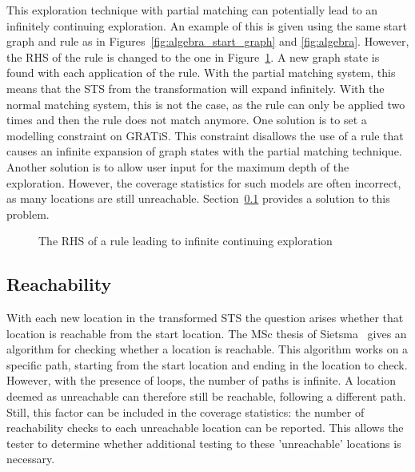 This exploration technique with partial matching can potentially lead to an infinitely continuing exploration. An example of this is given using the same start graph and rule as in Figures~\ref{fig:algebra_start_graph} and \ref{fig:algebra}. However, the RHS of the rule is changed to the one in Figure~\ref{fig:algebra_rhs2}. A new graph state is found with each application of the rule. With the partial matching system, this means that the STS from the transformation will expand infinitely. With the normal matching system, this is not the case, as the rule can only be applied two times and then the rule does not match anymore. One solution is to set a modelling constraint on GRATiS. This constraint disallows the use of a rule that causes an infinite expansion of graph states with the partial matching technique. Another solution is to allow user input for the maximum depth of the exploration. However, the coverage statistics for such models are often incorrect, as many locations are still unreachable. Section~\ref{sec:reachability} provides a solution to this problem. 

\begin{figure}[ht]
  \begin{center}
    
  \end{center}
  \caption{The RHS of a rule leading to infinite continuing exploration}
  \label{fig:algebra_rhs2}
\end{figure}

\subsection{Reachability}\label{sec:reachability}
With each new location in the transformed STS the question arises whether that location is reachable from the start location. The MSc thesis of Sietsma~\cite{Sietsma:reachability} gives an algorithm for checking whether a location is reachable. This algorithm works on a specific path, starting from the start location and ending in the location to check. However, with the presence of loops, the number of paths is infinite. A location deemed as unreachable can therefore still be reachable, following a different path. Still, this factor can be included in the coverage statistics: the number of reachability checks to each unreachable location can be reported. This allows the tester to determine whether additional testing to these 'unreachable' locations is necessary.
